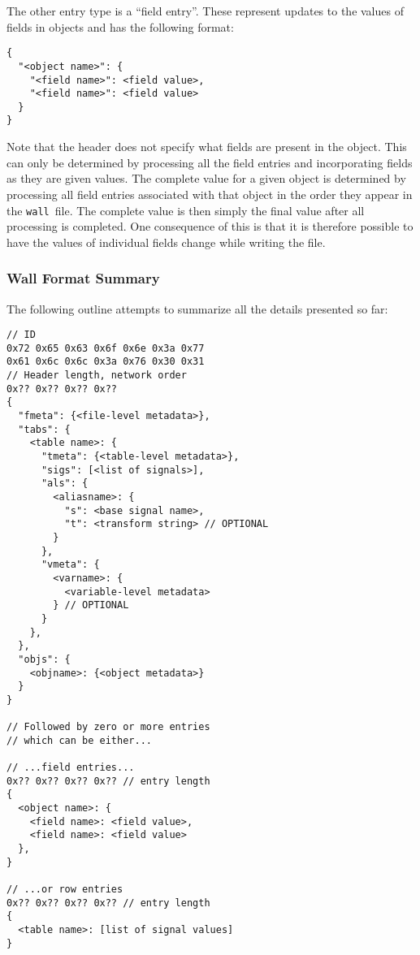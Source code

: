\documentclass[11pt,a4paper,twocolumn]{article}
\newcommand{\wall}{\texttt{wall}}
\begin{document}
The other entry type is a ``field entry''.  These represent updates to
the values of fields in objects and has the following format:

\begin{verbatim}
{
  "<object name>": {
    "<field name>": <field value>,
    "<field name>": <field value>
  }
}
\end{verbatim}

Note that the header does not specify what fields are present in the
object.  This can only be determined by processing all the field
entries and incorporating fields as they are given values.  The
complete value for a given object is determined by processing all
field entries associated with that object in the order they appear in
the \wall\ file.  The complete value is then simply the final value
after all processing is completed.  One consequence of this is that it
is therefore possible to have the values of individual fields change
while writing the file.

\subsubsection{Wall Format Summary}


The following outline attempts to summarize all the details presented so
far:

\begin{verbatim}
// ID
0x72 0x65 0x63 0x6f 0x6e 0x3a 0x77
0x61 0x6c 0x6c 0x3a 0x76 0x30 0x31
// Header length, network order
0x?? 0x?? 0x?? 0x??
{
  "fmeta": {<file-level metadata>},
  "tabs": {
    <table name>: {
      "tmeta": {<table-level metadata>},
      "sigs": [<list of signals>],
      "als": {
        <aliasname>: {
          "s": <base signal name>,
          "t": <transform string> // OPTIONAL
        }
      },
      "vmeta": {
        <varname>: {
          <variable-level metadata>
        } // OPTIONAL
      }
    },
  },
  "objs": {
    <objname>: {<object metadata>}
  }
}

// Followed by zero or more entries
// which can be either...

// ...field entries...
0x?? 0x?? 0x?? 0x?? // entry length
{
  <object name>: {
    <field name>: <field value>,
    <field name>: <field value>
  },
}

// ...or row entries
0x?? 0x?? 0x?? 0x?? // entry length
{
  <table name>: [list of signal values]  
}
\end{verbatim}
\end{document}

